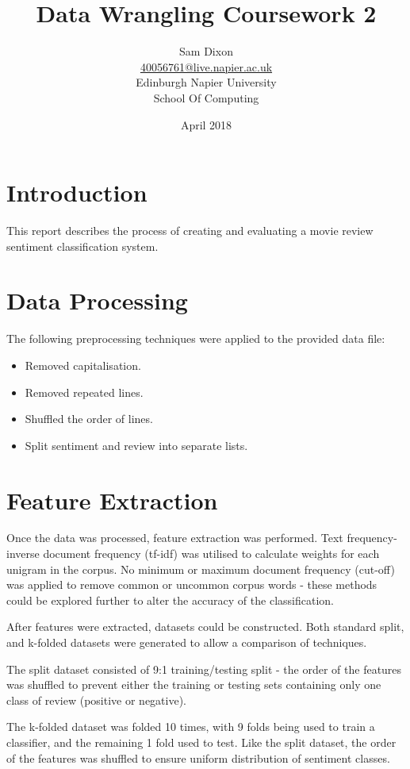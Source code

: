 \documentclass[twocolumn]{article}
\title{Data Wrangling Coursework 2}
\author{Sam Dixon
    \\\href{mailto:40056761@live.napier.ac.uk}{40056761@live.napier.ac.uk}
    \\Edinburgh Napier University
    \\School Of Computing
    \\}
\date{April 2018}
\begin{document}
\maketitle


\section{Introduction}
This report describes the process of creating and evaluating a movie review
sentiment classification system.


\section{Data Processing}
The following preprocessing techniques were applied to the provided data file:
\begin{itemize}
    \item Removed capitalisation.
    \item Removed repeated lines.
    \item Shuffled the order of lines.
    \item Split sentiment and review into separate lists.
\end{itemize}


\section{Feature Extraction}
Once the data was processed, feature extraction was performed.
Text frequency-inverse document frequency (tf-idf) was utilised to calculate
weights for each unigram in the corpus.
No minimum or maximum document frequency (cut-off) was applied to remove
common or uncommon corpus words - these methods could be explored further to
alter the accuracy of the classification.

After features were extracted, datasets could be constructed.
Both standard split, and k-folded datasets were generated to allow a
comparison of techniques.

The split dataset consisted of 9:1 training/testing split - the order of the
features was shuffled to prevent either the training or testing sets containing
only one class of review (positive or negative).

The k-folded dataset was folded 10 times, with 9 folds being used to train a
classifier, and the remaining 1 fold used to test.
Like the split dataset, the order of the features was shuffled to ensure
uniform distribution of sentiment classes.
\end{document}
